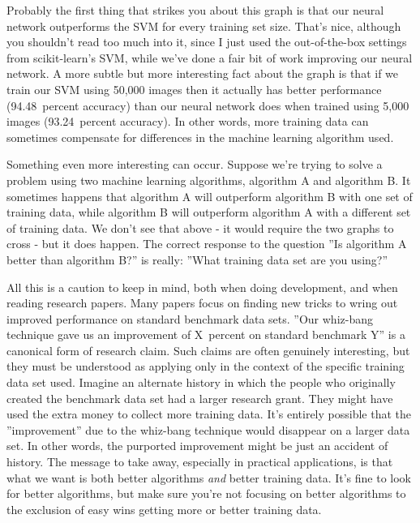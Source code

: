 Probably the first thing that strikes you about this graph is that our neural network outperforms the SVM for every training set size. That's nice, although you shouldn't read too much into it, since I just used the out-of-the-box settings from scikit-learn's SVM, while we've done a fair bit of work improving our neural network. A more subtle but more interesting fact about the graph is that if we train our SVM using 50,000 images then it actually has better performance (94.48~percent accuracy) than our neural network does when trained using 5,000 images (93.24~percent accuracy). In other words, more training data can sometimes compensate for differences in the machine learning algorithm used.

Something even more interesting can occur. Suppose we're trying to solve a problem using two machine learning algorithms, algorithm A and algorithm B. It sometimes happens that algorithm A will outperform algorithm B with one set of training data, while algorithm B will outperform algorithm A with a different set of training data. We don't see that above - it would require the two graphs to cross - but it does happen. The correct response to the question ''Is algorithm A better than algorithm B?'' is really: ''What training data set are you using?''

All this is a caution to keep in mind, both when doing development, and when reading research papers. Many papers focus on finding new tricks to wring out improved performance on standard benchmark data sets. ''Our whiz-bang technique gave us an improvement of X~percent on standard benchmark Y'' is a canonical form of research claim. Such claims are often genuinely interesting, but they must be understood as applying only in the context of the specific training data set used. Imagine an alternate history in which the people who originally created the benchmark data set had a larger research grant. They might have used the extra money to collect more training data. It's entirely possible that the ''improvement'' due to the whiz-bang technique would disappear on a larger data set. In other words, the purported improvement might be just an accident of history. The message to take away, especially in practical applications, is that what we want is both better algorithms \textit{and} better training data. It's fine to look for better algorithms, but make sure you're not focusing on better algorithms to the exclusion of easy wins getting more or better training data.

